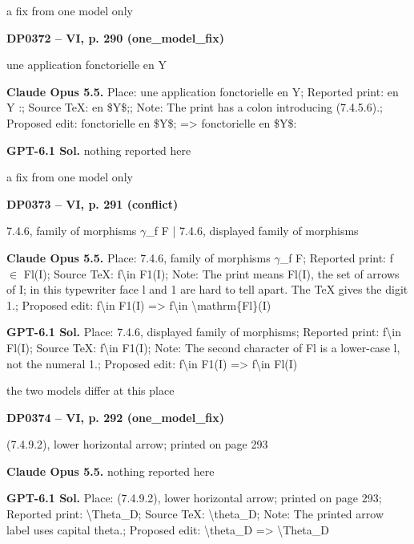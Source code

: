 a fix from one model only\par
\par\noindent\hypertarget{DP0372}{}\textbf{DP0372 -- VI, p. 290 (one\_model\_fix)}\par
une application fonctorielle en Y\par
\textbf{Claude Opus 5.5.} Place: une application fonctorielle en Y; Reported print: en Y :; Source TeX: en \$Y\$;; Note: The print has a colon introducing (7.4.5.6).; Proposed edit: fonctorielle en \$Y\$; =\allowbreak > fonctorielle en \$Y\$:\par
\textbf{GPT-6.1 Sol.} nothing reported here\par
a fix from one model only\par
\par\noindent\hypertarget{DP0373}{}\textbf{DP0373 -- VI, p. 291 (conflict)}\par
7.4.6, family of morphisms \ensuremath{\gamma}\_f F | 7.4.6, displayed family of morphisms\par
\textbf{Claude Opus 5.5.} Place: 7.4.6, family of morphisms \ensuremath{\gamma}\_f F; Reported print: f \ensuremath{\in} Fl(I); Source TeX: f\textbackslash{}in F1(I); Note: The print means Fl(I), the set of arrows of I; in this typewriter face l and 1 are hard to tell apart. The TeX gives the digit 1.; Proposed edit: f\textbackslash{}in F1(I) =\allowbreak > f\textbackslash{}in \textbackslash{}mathrm\{Fl\}(I)\par
\textbf{GPT-6.1 Sol.} Place: 7.4.6, displayed family of morphisms; Reported print: f\textbackslash{}in Fl(I); Source TeX: f\textbackslash{}in F1(I); Note: The second character of Fl is a lower-case l, not the numeral 1.; Proposed edit: f\textbackslash{}in F1(I) =\allowbreak > f\textbackslash{}in Fl(I)\par
the two models differ at this place\par
\par\noindent\hypertarget{DP0374}{}\textbf{DP0374 -- VI, p. 292 (one\_model\_fix)}\par
(7.4.9.2), lower horizontal arrow; printed on page 293\par
\textbf{Claude Opus 5.5.} nothing reported here\par
\textbf{GPT-6.1 Sol.} Place: (7.4.9.2), lower horizontal arrow; printed on page 293; Reported print: \textbackslash{}Theta\_D; Source TeX: \textbackslash{}theta\_D; Note: The printed arrow label uses capital theta.; Proposed edit: \textbackslash{}theta\_D =\allowbreak > \textbackslash{}Theta\_D\par
